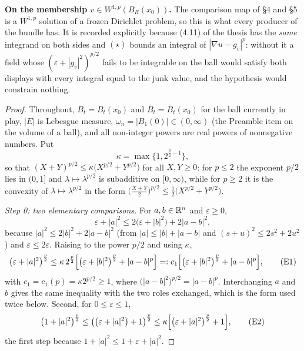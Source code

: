 \begin{helper}
\noindent\textbf{On the membership $v\in W^{1,p}(B_R(x_0))$.}  The comparison
map of \S4 and \S5 is a $W^{1,p}$ solution of a frozen Dirichlet problem, so
this is what every producer of the bundle has.  It is recorded explicitly
because (4.11) of the thesis has the \emph{same} integrand on both sides and
$(\star)$ bounds an integral of $|\nabla u-g_v|^p$: without it a field whose
$(\varepsilon+|g_v|^2)^{p/2}$ fails to be integrable on the ball would satisfy
both displays with every integral equal to the junk value, and the hypothesis
would constrain nothing.
\end{helper}
\begin{proof}
Throughout, $B_t=B_t(x_0)$ and $\overline B_t=\overline B_t(x_0)$ for the ball
currently in play, $|E|$ is Lebesgue measure, $\omega_n=|B_1(0)|\in(0,\infty)$
(the Preamble item on the volume of a ball), and all non-integer powers are
real powers of nonnegative numbers.  Put
\[
\kappa=\max\bigl\{1,2^{\frac p2-1}\bigr\},
\]
so that $(X+Y)^{p/2}\le\kappa\bigl(X^{p/2}+Y^{p/2}\bigr)$ for all $X,Y\ge0$: for
$p\le2$ the exponent $p/2$ lies in $(0,1]$ and $\lambda\mapsto\lambda^{p/2}$ is
subadditive on $[0,\infty)$, while for $p\ge2$ it is the convexity of
$\lambda\mapsto\lambda^{p/2}$ in the form
$\bigl(\frac{X+Y}2\bigr)^{p/2}\le\frac12\bigl(X^{p/2}+Y^{p/2}\bigr)$.


\emph{Step 0: two elementary comparisons.}  For $a,b\in\mathbb{R}^n$ and $\varepsilon\ge0$,
\[
\varepsilon+|a|^2\le2\bigl(\varepsilon+|b|^2\bigr)+2|a-b|^2 ,
\]
because $|a|^2\le2|b|^2+2|a-b|^2$ (from $|a|\le|b|+|a-b|$ and
$(s+u)^2\le2s^2+2u^2$) and $\varepsilon\le2\varepsilon$.  Raising to the power
$p/2$ and using $\kappa$,
\[
\bigl(\varepsilon+|a|^2\bigr)^{\frac p2}
\le\kappa\,2^{\frac p2}\Bigl[\bigl(\varepsilon+|b|^2\bigr)^{\frac p2}+|a-b|^{p}\Bigr]
=:c_1\Bigl[\bigl(\varepsilon+|b|^2\bigr)^{\frac p2}+|a-b|^{p}\Bigr],
\tag{E1}
\]
with $c_1=c_1(p)=\kappa2^{p/2}\ge1$, where $\bigl(|a-b|^2\bigr)^{p/2}=|a-b|^p$.
Interchanging $a$ and $b$ gives the same inequality with the two roles
exchanged, which is the form used twice below.  Second, for $0\le\varepsilon\le1$,
\[
\bigl(1+|a|^2\bigr)^{\frac p2}
\le\bigl(\bigl(\varepsilon+|a|^2\bigr)+1\bigr)^{\frac p2}
\le\kappa\Bigl[\bigl(\varepsilon+|a|^2\bigr)^{\frac p2}+1\Bigr],
\tag{E2}
\]
the first step because $1+|a|^2\le1+\varepsilon+|a|^2$.


\end{proof}

